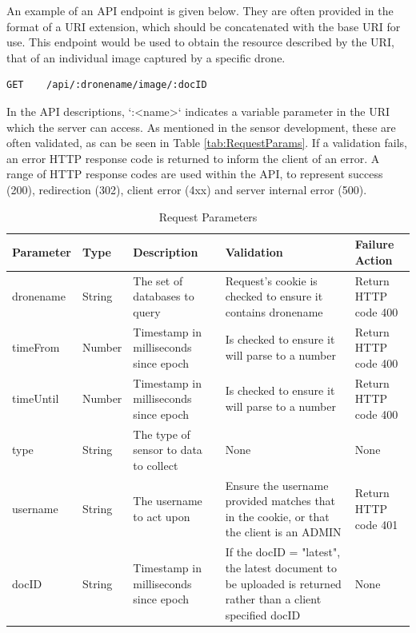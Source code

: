 \documentclass{article}
\begin{document}
An example of an API endpoint is given below. They are often provided in the format of a URI extension, which should be concatenated with the base URI for use. This endpoint would be used to obtain the resource described by the URI, that of an individual image captured by a specific drone.
\begin{lstlisting}
GET    /api/:dronename/image/:docID
\end{lstlisting}
In the API descriptions, `:\textless name\textgreater` indicates a variable parameter in the URI which the server can access\cite{expressDocs}. As mentioned in the sensor development, these are often validated, as can be seen in Table \ref{tab:RequestParams}. If a validation fails, an error HTTP response code is returned to inform the client of an error. A range of HTTP response codes are used within the API, to represent success (200), redirection (302), client error (4xx) and server internal error (500).

\begin{table}[ht]
\caption{Request Parameters\label{tab:RequestParams}}
\centering
\renewcommand{\arraystretch}{1.5}
\begin{tabularx}{\textwidth}{>{\centering}p{1.5cm} >{\centering}p{1cm} >{\centering}p{3cm} p{5cm} X}
Parameter & Type & Description & Validation & Failure Action \\ [0.5ex]
\hline
dronename & String & The set of databases to query & Request's cookie is checked to ensure it contains dronename & Return HTTP code 400 \\
timeFrom  & Number & Timestamp in milliseconds since epoch  & Is checked to ensure it will parse to a number & Return HTTP code 400 \\
timeUntil & Number & Timestamp in milliseconds since epoch  & Is checked to ensure it will parse to a number & Return HTTP code 400 \\
type      & String & The type of sensor to data to collect & None & None \\
username  & String & The username to act upon & Ensure the username provided matches that in the cookie, or that the client is an ADMIN & Return HTTP code 401 \\ 
docID 	  & String & Timestamp in milliseconds since epoch & If the docID = "latest", the latest document to be uploaded is returned rather than a client specified docID & None \\ [1ex]
\hline
\end{tabularx}
\label{table:requestParams}
\end{table}
\end{document}
